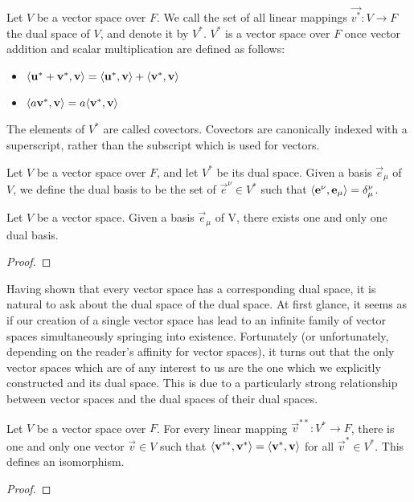 \documentclass[../main.tex]{subfiles}
\begin{document}
    \begin{definition}
        Let \(V\) be a vector space over \(F\). We call the set of all linear mappings \(\vec{v^{*}}:V\to{}F\) the dual space of \(V\), and denote it by \(V^{*}\). \(V^{*}\) is a vector space over \(F\) once vector addition and scalar multiplication are defined as follows:
        \begin{itemize}
            \item\(\langle\mathbf{u}^{*}+\mathbf{v}^{*},\mathbf{v}\rangle=\langle\mathbf{u}^{*},\mathbf{v}\rangle+\langle\mathbf{v}^{*},\mathbf{v}\rangle\)
            \item\(\langle a\mathbf{v}^{*},\mathbf{v}\rangle=a\langle\mathbf{v}^{*},\mathbf{v}\rangle\)
        \end{itemize}
        The elements of \(V^{*}\) are called covectors. Covectors are canonically indexed with a superscript, rather than the subscript which is used for vectors.
    \end{definition}
    \begin{definition}
        Let \(V\) be a vector space over \(F\), and let \(V^{*}\) be its dual space. Given a basis \(\vec{e}_{\mu}\) of \(V\), we define the dual basis to be the set of \(\vec{e}^{\nu}\in{}V^{*}\) such that \(\langle\mathbf{e}^{\nu},\mathbf{e}_{\mu}\rangle=\delta^{\nu}_{\mu}\).
    \end{definition}
    \begin{theorem}
        Let \(V\) be a vector space. Given a basis \(\vec{e}_{\mu}\) of V, there exists one and only one dual basis.
        \begin{proof}
        \end{proof}
    \end{theorem}
    Having shown that every vector space has a corresponding dual space, it is natural to ask about the dual space of the dual space. At first glance, it seems as if our creation of a single vector space has lead to an infinite family of vector spaces simultaneously springing into existence. Fortunately (or unfortunately, depending on the reader's affinity for vector spaces), it turns out that the only vector spaces which are of any interest to us are the one which we explicitly constructed and its dual space. This is due to a particularly strong relationship between vector spaces and the dual spaces of their dual spaces.
    \begin{theorem}
        Let \(V\) be a vector space over \(F\). For every linear mapping \(\vec{v}^{**}:V^{*}\to{}F\), there is one and only one vector \(\vec{v}\in{}V\) such that \(\langle\mathbf{v}^{**},\mathbf{v}^{*}\rangle=\langle\mathbf{v}^{*},\mathbf{v}\rangle\) for all \(\vec{v}^{*}\in{}V^{*}\). This defines an isomorphism.
        \begin{proof}
        \end{proof}
    \end{theorem}
\end{document}
